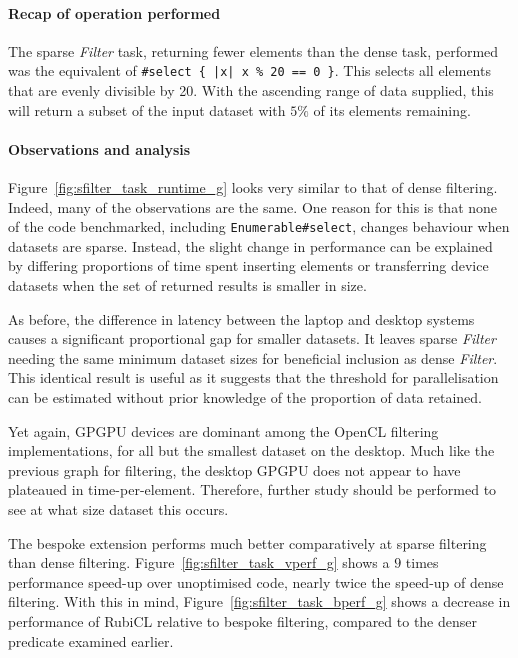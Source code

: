 \paragraph*{Recap of operation performed}
The sparse \emph{Filter} task, returning fewer elements than the dense task, performed was the equivalent of \verb!#select { |x| x % 20 == 0 }!. This selects all elements that are evenly divisible by 20. With the ascending range of data supplied, this will return a subset of the input dataset with $5\%$ of its elements remaining.

\paragraph*{Observations and analysis}
Figure~\ref{fig:sfilter_task_runtime_g} looks very similar to that of dense filtering. Indeed, many of the observations are the same.
One reason for this is that none of the code benchmarked, including \verb|Enumerable#select|, changes behaviour when datasets are sparse.
Instead, the slight change in performance can be explained by differing proportions of time spent inserting elements or transferring device datasets when the set of returned results is smaller in size.

As before, the difference in latency between the laptop and desktop systems causes a significant proportional gap for smaller datasets.
It leaves sparse \emph{Filter} needing the same minimum dataset sizes for beneficial inclusion as dense \emph{Filter}.
This identical result is useful as it suggests that the threshold for parallelisation can be estimated without prior knowledge of the proportion of data retained.

Yet again, \ac{GPGPU} devices are dominant among the \ac{OpenCL} filtering implementations, for all but the smallest dataset on the desktop.
Much like the previous graph for filtering, the desktop \ac{GPGPU} does not appear to have plateaued in time-per-element. Therefore, further study should be performed to see at what size dataset this occurs.

The bespoke extension performs much better comparatively at sparse filtering than dense filtering. Figure~\ref{fig:sfilter_task_vperf_g} shows a $9$ times performance speed-up over unoptimised code, nearly twice the speed-up of dense filtering.
With this in mind, Figure~\ref{fig:sfilter_task_bperf_g} shows a decrease in performance of RubiCL relative to bespoke filtering, compared to the denser predicate examined earlier.

